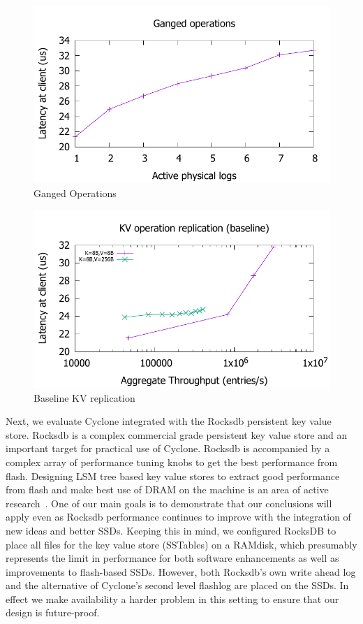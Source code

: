 \documentclass[twocolumn]{article}
\begin{document}
\begin{figure}
  \includegraphics[scale=0.6]{results2/multi.pdf}
  \caption{Ganged Operations}
  \label{fig:ganged}
\end{figure}

\begin{figure}
  \includegraphics[scale=0.6]{results2/kv_baseline.pdf}
  \caption{Baseline KV replication}
  \label{fig:kv_baseline}
\end{figure}

Next, we evaluate Cyclone integrated with the Rocksdb persistent key value
store. Rocksdb is a complex commercial grade persistent key value store and
an important target for practical use of Cyclone.  Rocksdb is accompanied by a
complex array of performance tuning knobs to get the best performance from
flash. Designing LSM tree based key value stores to extract good performance
from flash and make best use of DRAM on the machine is an area of active
research~\cite{flodb, triad}. One of our main goals is to demonstrate that
our conclusions will apply even as Rocksdb performance continues to improve
with the integration of new ideas and better SSDs. Keeping this in mind, we
configured RocksDB to place all files for the
key value store (SSTables) on a RAMdisk, which presumably represents the limit
in performance for both software enhancements as well as improvements to
flash-based SSDs. However, both Rocksdb's own write ahead log and the
alternative of Cyclone's second level flashlog are placed on the SSDs. In
effect we make availability a harder problem in this setting to ensure that our
design is future-proof.
\end{document}
